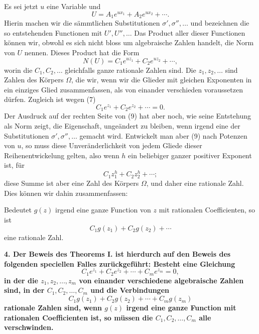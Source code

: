 \documentclass[11pt]{article}
\begin{document}
Es sei jetzt $u$ eine Variable und
\begin{equation}\tag{8}
U=A_1e^{ux_1}+A_2e^{ux_2}+\cdots .
\end{equation}
Hierin machen wir die sämmtlichen Substitutionen $\sigma',\sigma'',\ldots$ und bezeichnen die so entstehenden Functionen mit $U',U'',\ldots$ Das Product aller dieser Functionen können wir, obwohl es sich nicht bloss um algebraische Zahlen handelt, die Norm von $U$ nennen. Dieses Product hat die Form
\begin{equation}\tag{9}
N(U)=C_1e^{uz_1}+C_2e^{uz_2}+\cdots,
\end{equation}
worin die $C_1,C_2,\ldots$ gleichfalls ganze rationale Zahlen sind. Die $z_1,z_2,\ldots$ sind Zahlen des Körpers $\Omega$, die wir, wenn wir die Glieder mit gleichen Exponenten in ein einziges Glied zusammenfassen, als von einander verschieden voraussetzen dürfen. Zugleich ist wegen (7)
\begin{equation}\tag{10}
C_1e^{z_1}+C_2e^{z_2}+\cdots=0.
\end{equation}
Der Ausdruck auf der rechten Seite von (9) hat aber noch, wie seine Entstehung als Norm zeigt, die Eigenschaft, ungeändert zu bleiben, wenn irgend eine der Substitutionen $\sigma',\sigma'',\ldots$ gemacht wird. Entwickelt man aber (9) nach Potenzen von $u$, so muss diese Unveränderlichkeit von jedem Gliede dieser Reihenentwickelung gelten, also wenn $h$ ein beliebiger ganzer positiver Exponent ist, für
\[
C_1z_1^h+C_2z_2^h+\cdots;
\]
diese Summe ist aber eine Zahl des Körpers $\Omega$, und daher eine rationale Zahl. Dies können wir dahin zusammenfassen:

Bedeutet $g(z)$ irgend eine ganze Function von $z$ mit rationalen Coefficienten, so ist
\[
C_1g(z_1)+C_2g(z_2)+\cdots
\]
eine rationale Zahl.

\textbf{4. Der Beweis des Theorems I. ist hierdurch auf den Beweis des folgenden speciellen Falles zurückgeführt: Besteht eine Gleichung}
\begin{equation}\tag{11}
C_1e^{z_1}+C_2e^{z_2}+\cdots+C_me^{z_m}=0,
\end{equation}
\textbf{in der die $z_1,z_2,\ldots,z_m$ von einander verschiedene algebraische Zahlen sind, in der $C_1,C_2,\ldots,C_m$ und die Verbindungen}
\begin{equation}\tag{12}
C_1g(z_1)+C_2g(z_2)+\cdots+C_mg(z_m)
\end{equation}
\textbf{rationale Zahlen sind, wenn $g(z)$ irgend eine ganze Function mit rationalen Coefficienten ist, so müssen die $C_1,C_2,\ldots,C_m$ alle verschwinden.}
\end{document}
